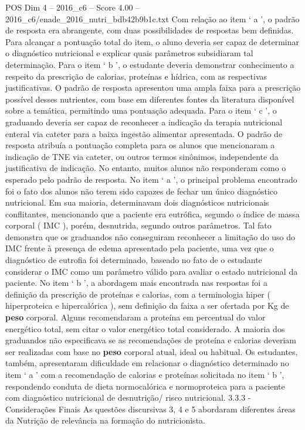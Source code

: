 \begin{textsample}{POS Dim 4 – 2016\_c6 – Score 4.00 – 2016\_c6/enade\_2016\_nutri\_bdb42b9b1c.txt}
Com relação ao item ‘ a ’, o padrão de resposta era abrangente, com duas possibilidades de respostas bem definidas.
Para alcançar a pontuação total do item, o aluno deveria ser capaz de determinar o diagnóstico nutricional e explicar quais parâmetros subsidiaram tal determinação.
Para o item ‘ b ’, o estudante deveria demonstrar conhecimento a respeito da prescrição de calorias, proteínas e hídrica, com as respectivas justificativas.
O padrão de resposta apresentou uma ampla faixa para a prescrição possível desses nutrientes, com base em diferentes fontes da literatura disponível sobre a temática, permitindo uma pontuação adequada.
Para o item ‘ c ’, o graduando deveria ser capaz de reconhecer a indicação da terapia nutricional enteral via cateter para a baixa ingestão alimentar apresentada.
O padrão de resposta atribuía a pontuação completa para os alunos que mencionaram a indicação de TNE via cateter, ou outros termos sinônimos, independente da justificativa de indicação.
No entanto, muitos alunos não responderam como o esperado pelo padrão de resposta.
No item ‘ a ’, o principal problema encontrado foi o fato dos alunos não terem sido capazes de fechar um único diagnóstico nutricional.
Em sua maioria, determinavam dois diagnósticos nutricionais conflitantes, mencionando que a paciente era eutrófica, segundo o índice de massa corporal ( IMC ), porém, desnutrida, segundo outros parâmetros.
Tal fato demonstra que os graduandos não conseguiram reconhecer a limitação do uso do IMC frente à presença de edema apresentado pela paciente, uma vez que o diagnóstico de eutrofia foi determinado, baseado no fato de o estudante considerar o IMC como um parâmetro válido para avaliar o estado nutricional da paciente.
No item ‘ b ’, a abordagem mais encontrada nas respostas foi a definição da prescrição de proteínas e calorias, com a terminologia hiper ( hiperproteica e hipercalórica ), sem definição da faixa a ser ofertada por Kg de \textbf{peso} corporal.
Alguns recomendaram a proteína em percentual do valor energético total, sem citar o valor energético total considerado.
A maioria dos graduandos não especificava se as recomendações de proteína e calorias deveriam ser realizadas com base no \textbf{peso} corporal atual, ideal ou habitual.
Os estudantes, também, apresentaram dificuldade em relacionar o diagnóstico determinado no item ‘ a ’ com a recomendação de calorias e proteínas solicitada no item ‘ b ’, respondendo conduta de dieta normocalórica e normoproteica para a paciente com diagnóstico nutricional de desnutrição/ risco nutricional. 3.3.3 - Considerações Finais As questões discursivas 3, 4 e 5 abordaram diferentes áreas da Nutrição de relevância na formação do nutricionista.

\end{textsample}
